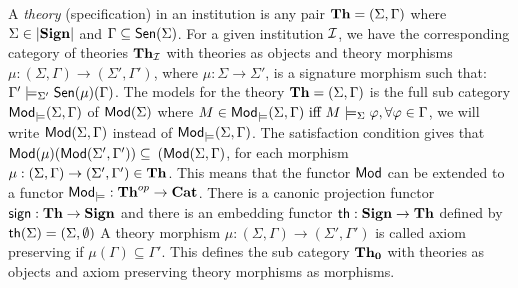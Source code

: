 \documentclass[10pt]{article}
\begin{document}
A {\em theory} (specification) in an institution is any pair
${\bf Th}=(\Sigma,\Gamma)$ where $\Sigma\in|{\bf Sign}|$ and $\Gamma\subseteq
{\sf {Sen}}(\Sigma)$. For a given institution ${\mathcal{I}}$, we have the corresponding
category of theories ${\bf Th_{{\mathcal{I}}}}$ with theories as objects and
theory morphisms $\mu:(\Sigma,\Gamma) \to (\Sigma',\Gamma')$, where
$\mu:\Sigma \to \Sigma'$, is a signature morphism such that: $\Gamma'
\models_{\Sigma'} {\sf {Sen}}(\mu)(\Gamma)$.  The models for the theory
${\bf Th}=(\Sigma,\Gamma)$ is the full sub category
${\sf {Mod}}_{\models}(\Sigma,\Gamma)$ of ${\sf {Mod}}(\Sigma)$ where $M \in
{\sf {Mod}}_{\models}(\Sigma,\Gamma) \mbox{ iff } M \models_{\Sigma} \varphi,
\forall \varphi \in \Gamma$, we will write ${\sf {Mod}}(\Sigma,\Gamma)$ instead of
${\sf {Mod}}_{\models}(\Sigma,\Gamma)$.  The satisfaction condition gives that
${\sf {Mod}}(\mu)({\sf {Mod}}(\Sigma',\Gamma')) \subseteq$ %
$({\sf {Mod}}(\Sigma,\Gamma)$, for each morphism $\mu:(\Sigma,\Gamma) \to
(\Sigma',\Gamma') \in {\bf Th}$. This means that the functor ${\sf {Mod}}$ can be
extended to a functor ${\sf {Mod}}_{\models}:{\bf Th}^{op} \to {\bf Cat}$. There is
a canonic projection functor ${\sf {sign}}:{\bf Th} \to {\bf Sign}$ and there is
an embedding functor ${\sf {th}}: {\bf Sign} \to {\bf Th}$ defined by
${\sf {th}}(\Sigma)= (\Sigma,\emptyset)$ A theory morphism $\mu:(\Sigma,\Gamma)
\to (\Sigma',\Gamma')$ is called axiom preserving if $\mu(\Gamma) \subseteq
\Gamma'$. This defines the sub category ${\bf Th_0}$ with theories as objects
and axiom preserving theory morphisms as morphisms.
\end{document}
